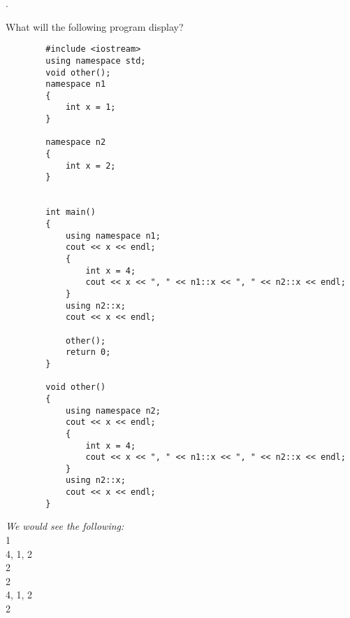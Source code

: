 \documentclass{amsart}
\begin{document}
\phantom{}
\vfill
{}. 
\begin{minipage}[t]{11.5 cm}
	What will the following program display?
	\begin{verbatim}
		#include <iostream>
		using namespace std;
		void other();
		namespace n1
		{
		    int x = 1;
		}

		namespace n2
		{
		    int x = 2;
		}


		int main()
		{
		    using namespace n1;
		    cout << x << endl;
		    {
		        int x = 4;
		        cout << x << ", " << n1::x << ", " << n2::x << endl;
		    }
		    using n2::x;
		    cout << x << endl;

		    other();
		    return 0;
		}

		void other()
		{
		    using namespace n2;
		    cout << x << endl;
		    {
		        int x = 4;
		        cout << x << ", " << n1::x << ", " << n2::x << endl;
		    }
		    using n2::x;
		    cout << x << endl;
		}
	\end{verbatim}
\end{minipage}
\phantom{2. } 
\begin{minipage}[t]{11.5 cm}
	{\slshape We would see the following:}\\
	\phantom{\qquad}1 \\
	\phantom{\qquad}4, 1, 2 \\
	\phantom{\qquad}2 \\
	\phantom{\qquad}2 \\
	\phantom{\qquad}4, 1, 2 \\
	\phantom{\qquad}2
\end{minipage} 
\vfill
\end{document}
